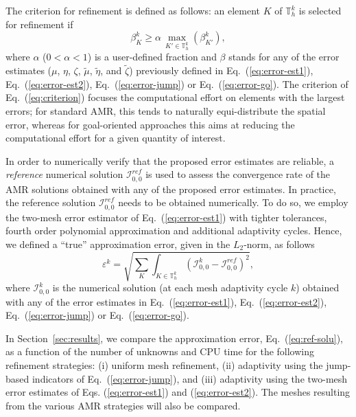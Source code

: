 \documentclass[preprint,10pt]{elsarticle}
\newcommand{\be}{\begin{equation}}
\newcommand{\ee}{\end{equation}}
\newcommand{\eqt}[1]{Eq.~(\ref{#1})}                     %
\renewcommand{\(}{\left(}
\renewcommand{\)}{\right)}
\renewcommand{\[}{\left[}
\renewcommand{\]}{\right]}
\begin{document}
The criterion for refinement is defined as follows: an element $K$ of $\mathbb{T}_h^k$ is selected for refinement if
\be
\beta _{K}^{k} \ge \alpha \, \max_{K'\in \mathbb{T}_{h}^k} \left( \beta _{K'}^{k} \right),
\label{eq:criterion}
\ee
where $\alpha$ ($0 < \alpha < 1$) is a user-defined fraction and $\beta$ stands for any of the error estimates ($\mu$, $\eta$, $\zeta$, $\widetilde \mu$, $\widetilde \eta$, and $\widetilde \zeta$)
previously defined in \eqt{eq:error-est1}, \eqt{eq:error-est2}, \eqt{eq:error-jump} or \eqt{eq:error-go}. 
The criterion of \eqt{eq:criterion} focuses the computational effort on elements with the largest errors; for
standard AMR, this tends to naturally equi-distribute the spatial error, whereas for goal-oriented approaches
this aims at reducing the computational effort for a given quantity of interest. 

In order to numerically verify that the proposed error estimates are reliable, a \emph{reference} numerical solution $\mathcal{I}_{0,0}^{\textit{ref}}$ is used to assess the convergence rate of the AMR solutions obtained with any of the proposed error estimates. 
In practice, the reference solution $\mathcal{I}_{0,0}^{\textit{ref}}$ needs to be obtained numerically. To do so, we employ the two-mesh error estimator of \eqt{eq:error-est1} with tighter tolerances, fourth order polynomial approximation and additional adaptivity cycles. 
Hence, we defined a ``true'' approximation error, given in the $L_2$-norm, as follows
%
\be
\varepsilon^k = \sqrt{ \sum_K \int_{K\in \mathbb{T}^{k}_{h}}
\left( \mathcal{I}_{0,0}^{k} - \mathcal{I}_{0,0}^{\textit{ref}}\right) ^{2} },
\label{eq:ref-solu}
\ee
%
where  $\mathcal{I}_{0,0}^{k}$ is the numerical solution (at each mesh adaptivity cycle $k$) obtained with any of the error estimates in \eqt{eq:error-est1}, \eqt{eq:error-est2}, \eqt{eq:error-jump}  or \eqt{eq:error-go}. 


In Section~\ref{sec:results}, we compare the approximation error, \eqt{eq:ref-solu}, as a function of the number of unknowns and CPU time for the following  refinement strategies: (i) uniform mesh refinement, (ii) adaptivity using the jump-based indicators of \eqt{eq:error-jump}, and (iii) adaptivity using the two-mesh error estimates of Eqs. (\ref{eq:error-est1}) and (\ref{eq:error-est2}). The meshes resulting from the various AMR strategies will also be compared.


 
\end{document}
